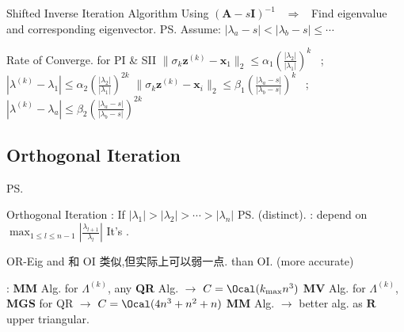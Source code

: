 \documentclass{note}
\begin{document}
\begin{MyTh}{Shifted Inverse Iteration Algorithm}
  Using $(\mathbf{A}-s\mathbf{I})^{-1}$ \ $\Rightarrow$ \ Find eigenvalue  and corresponding eigenvector. \quad \ps{\footnotesize Assume: $|\lambda_a - s|<|\lambda_b - s|\leq\cdots$}
\end{MyTh}

\begin{MyTh}{Rate of Converge. for PI \& SII}
  \scriptsize {} {\tiny $\|\sigma_k\mathbf{z}^{(k)}-\mathbf{x}_1\|_2\leq\alpha_1(\frac{|\lambda_2|}{|\lambda_1|})^k$ \ ; \ $|\lambda^{(k)}-\lambda_1|\leq\alpha_2(\frac{|\lambda_2|}{|\lambda_1|})^{2k}$} \quad {} {\tiny $\|\sigma_k\mathbf{z}^{(k)}-\mathbf{x}_i\|_2\leq\beta_1(\frac{|\lambda_{a}-s|}{|\lambda_{b}-s|})^k$ \ ; \ $|\lambda^{(k)}-\lambda_a|\leq\beta_2(\frac{|\lambda_{a}-s|}{|\lambda_{b}-s|})^{2k}$}
\end{MyTh}


\subsection{Orthogonal Iteration}
\vspace{-8pt}\hspace{120pt}\ps{\tiny \quad {}}

\begin{MyTh}{Orthogonal Iteration}
  : If $|\lambda_1|>|\lambda_2|>\cdots>|\lambda_n|$ \ps{(distinct)}. : depend on $\max_{1\leq l\leq n-1}|\frac{\lambda_{l+1}}{\lambda_l}|$ \quad It's .
\end{MyTh}

\begin{MyTh}{OR-Eig}
   and  {\tiny 和 OI 类似,但实际上可以弱一点.} \quad {} than OI. (more accurate)

  \quad {}: \tiny {} \textbf{MM} Alg. for $\Lambda^{(k)}$, any \textbf{QR} Alg. $\to$ $C=\Ocal(k_{\max}n^3)$ \quad {} \textbf{MV} Alg. for $\Lambda^{(k)}$, \textbf{MGS} for QR $\to$ $C=\Ocal(4n^3+n^2+n)$ \quad {} \textbf{MM} Alg. $\to$ better alg. as $\mathbf{R}$ upper triangular.
\end{MyTh}
\end{document}

